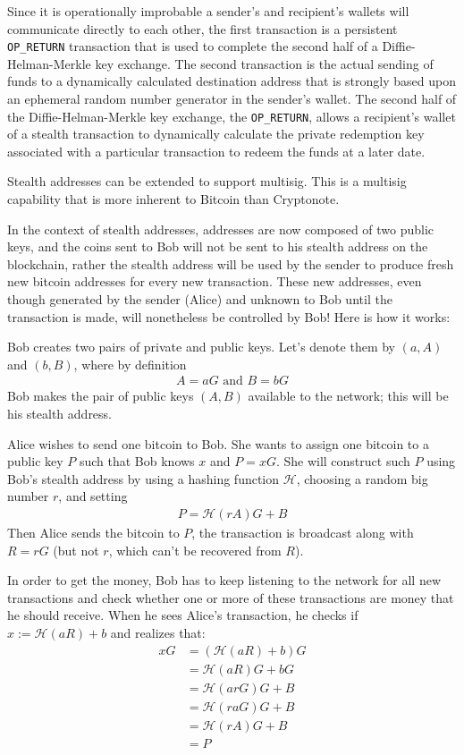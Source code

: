 Since it is operationally improbable a sender's and recipient's wallets will communicate directly to each other, the first transaction is a persistent \verb|OP_RETURN| transaction that is used to complete the second half of a Diffie-Helman-Merkle key exchange. The second transaction is the actual sending of funds to a dynamically calculated destination address that is strongly based upon an ephemeral random number generator in the sender's wallet. The second half of the Diffie-Helman-Merkle key exchange, the \verb|OP_RETURN|, allows a recipient's wallet of a stealth transaction to dynamically calculate the private redemption key associated with a particular transaction to redeem the funds at a later date.

Stealth addresses can be extended to support multisig. This is a multisig capability that is more inherent to Bitcoin than Cryptonote.

In the context of stealth addresses, addresses are now composed of two public keys, and the coins sent to Bob will not be sent to his stealth address on the blockchain, rather the stealth address will be used by the sender to produce fresh new bitcoin addresses for every new transaction. These new addresses, even though generated by the sender (Alice) and unknown to Bob until the transaction is made, will nonetheless be controlled by Bob! Here is how it works:

Bob creates two pairs of private and public keys. Let's denote them by $(a,A)$ and $(b,B)$, where by definition
\begin{align*}
  A = aG \mbox{ and } B = bG
\end{align*}
Bob makes the pair of public keys $(A,B)$ available to the network; this will be his stealth address.

Alice wishes to send one bitcoin to Bob. She wants to assign one bitcoin to a public key $P$ such that Bob knows $x$ and $P = xG$. She will construct such $P$ using Bob's stealth address by using a hashing function $\mathcal{H}$, choosing a random big number $r$, and setting
\begin{align*}
  P = \mathcal{H}(rA)G + B
\end{align*}
Then Alice sends the bitcoin to $P$, the transaction is broadcast along with $R = rG$ (but not $r$, which can't be recovered from $R$).

In order to get the money, Bob has to keep listening to the network for all new transactions and check whether one or more of these transactions are money that he should receive. When he sees Alice's transaction, he checks if $x := \mathcal{H}(aR)+b$ and realizes that:
\begin{align*}\label{eq:checkstealth}
  xG &= (\mathcal{H}(aR)+b)G \\
     &= \mathcal{H}(aR)G+bG \\
     &= \mathcal{H}(arG)G+B \\
     &= \mathcal{H}(raG)G+B \\
     &= \mathcal{H}(rA)G+B \\
     &= P
\end{align*}

